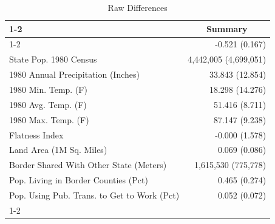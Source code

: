 \begin{table}[!h]
\caption{Raw Differences}
\centering
\begin{tabular}{ll}
\cline{1-2}
\multicolumn{1}{r}{} &
  \multicolumn{1}{c}{Summary} \\
\cline{1-2}
\multicolumn{1}{l}{Elasticity (M2, With Covariates)} &
  \multicolumn{1}{r}{-0.521 (0.167)} \\
\multicolumn{1}{l}{State Pop. 1980 Census} &
  \multicolumn{1}{r}{4,442,005 (4,699,051)} \\
\multicolumn{1}{l}{1980 Annual Precipitation (Inches)} &
  \multicolumn{1}{r}{33.843 (12.854)} \\
\multicolumn{1}{l}{1980 Min. Temp. (F)} &
  \multicolumn{1}{r}{18.298 (14.276)} \\
\multicolumn{1}{l}{1980 Avg. Temp. (F)} &
  \multicolumn{1}{r}{51.416 (8.711)} \\
\multicolumn{1}{l}{1980 Max. Temp. (F)} &
  \multicolumn{1}{r}{87.147 (9.238)} \\
\multicolumn{1}{l}{Flatness Index} &
  \multicolumn{1}{r}{-0.000 (1.578)} \\
\multicolumn{1}{l}{Land Area (1M Sq. Miles)} &
  \multicolumn{1}{r}{0.069 (0.086)} \\
\multicolumn{1}{l}{Border Shared With Other State (Meters)} &
  \multicolumn{1}{r}{1,615,530 (775,778)} \\
\multicolumn{1}{l}{Pop. Living in Border Counties (Pct)} &
  \multicolumn{1}{r}{0.465 (0.274)} \\
\multicolumn{1}{l}{Pop. Using Pub. Trans. to Get to Work (Pct)} &
  \multicolumn{1}{r}{0.052 (0.072)} \\
\cline{1-2}
\end{tabular}
\end{table}
